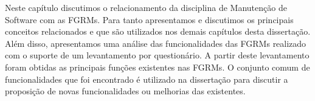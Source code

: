 Neste capítulo discutimos o relacionamento da disciplina de Manutenção de
Software com as FGRMs. Para tanto apresentamos e discutimos os principais
conceitos relacionados e que são utilizados nos demais capítulos desta
dissertação. Além disso, apresentamos uma análise das funcionalidades das FGRMs
realizado com o suporte de um levantamento por questionário. A partir deste
levantamento foram obtidas as principais funções existentes nas FGRMs. O
conjunto comum de funcionalidades que foi encontrado é utilizado na dissertação
para discutir a proposição de novas funcionalidades ou melhorias das
existentes.
